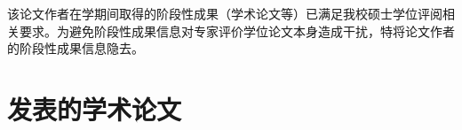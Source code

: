 \begin{resume}
\ifisanon
    \ifisblind
        \isanonfalse
    \else
        \ifismaster
        该论文作者在学期间取得的阶段性成果（学术论文等）已满足我校硕士学位评阅相关要求。为避免阶段性成果信息对专家评价学位论文本身造成干扰，特将论文作者的阶段性成果信息隐去。
        \else
          \section*{发表的学术论文} %

          \begin{enumerate}[label={[\arabic*]},labelsep=6pt,topsep=0pt,partopsep=0pt,
        parsep=0pt,itemsep=1pt,leftmargin=0em,itemindent=42pt]

\end{enumerate}
\end{resume}
